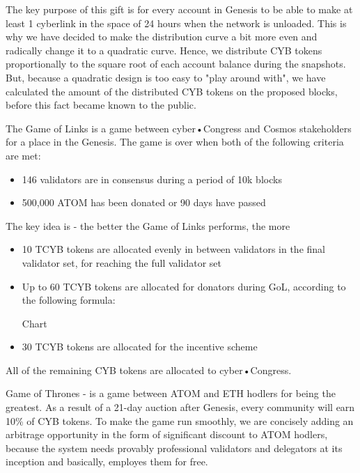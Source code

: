 \documentclass[8pt,oneside]{amsart}
\begin{document}
\begin{Abstract}
The key purpose of this gift is for every account in Genesis to be able to make at least 1 cyberlink in the space of 24 hours when the network is unloaded. This is why we have decided to make the distribution curve a bit more even and radically change it to a quadratic curve. Hence, we distribute CYB tokens proportionally to the square root of each account balance during the snapshots. But, because a quadratic design is too easy to "play around with", we have calculated the amount of the distributed CYB tokens on the proposed blocks, before this fact became known to the public.

The Game of Links is a game between cyber•Congress and Cosmos stakeholders for a place in the Genesis. The game is over when both of the following criteria are met:

\begin{itemize}
\item 146 validators are in consensus during a period of 10k blocks
\item 500,000 ATOM has been donated or 90 days have passed
\end{itemize}

The key idea is - the better the Game of Links performs, the more %

\begin{itemize}
\item 10 TCYB tokens are allocated evenly in between validators in the final validator set, for reaching the full validator set
\item Up to 60 TCYB tokens are allocated for donators during GoL, according to the following formula:

Chart

\item 30 TCYB tokens are allocated for the incentive scheme
\end{itemize}

All of the remaining CYB tokens are allocated to cyber•Congress.

Game of Thrones - is a game between ATOM and ETH hodlers for being the greatest. As a result of a 21-day auction after Genesis, every community will earn 10\% of CYB tokens. To make the game run smoothly, we are concisely adding an arbitrage opportunity in the form of significant discount to ATOM hodlers, because the system needs provably professional validators and delegators at its inception and basically, employes them for free.


\end{Abstract}
\end{document}
